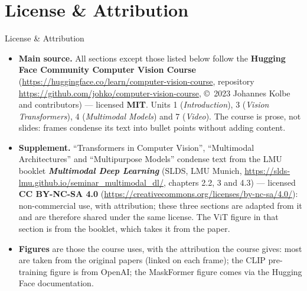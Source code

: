 \section{License \& Attribution}

\begin{frame}[shrink=30]{License \& Attribution}
\begin{itemize}
\item \textbf{Main source.} All sections except those listed below follow the \textbf{Hugging Face Community Computer Vision Course} (\url{https://huggingface.co/learn/computer-vision-course}, repository \url{https://github.com/johko/computer-vision-course}, \copyright\ 2023 Johannes Kolbe and contributors) --- licensed \textbf{MIT}. Units 1 (\textit{Introduction}), 3 (\textit{Vision Transformers}), 4 (\textit{Multimodal Models}) and 7 (\textit{Video}). The course is prose, not slides: frames condense its text into bullet points without adding content.
\item \textbf{Supplement.} \enquote{Transformers in Computer Vision}, \enquote{Multimodal Architectures} and \enquote{Multipurpose Models} condense text from the LMU booklet \textbf{\textit{Multimodal Deep Learning}} (SLDS, LMU Munich, \url{https://slds-lmu.github.io/seminar_multimodal_dl/}, chapters 2.2, 3 and 4.3) --- licensed \textbf{CC BY-NC-SA 4.0} (\url{https://creativecommons.org/licenses/by-nc-sa/4.0/}): non-commercial use, with attribution; these three sections are adapted from it and are therefore shared under the same license. The ViT figure in that section is from the booklet, which takes it from the paper.
\item \textbf{Figures} are those the course uses, with the attribution the course gives: most are taken from the original papers (linked on each frame); the CLIP pre-training figure is from OpenAI; the MaskFormer figure comes via the Hugging Face documentation.
\end{itemize}
\end{frame}

\endlecture

